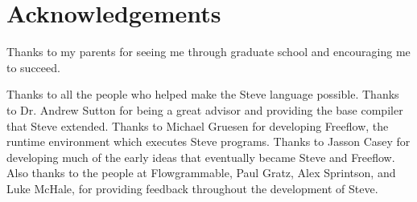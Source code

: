 \chapter*{Acknowledgements}

Thanks to my parents for seeing me through graduate school and encouraging me to succeed.

Thanks to all the people who helped make the Steve language possible.
Thanks to Dr. Andrew Sutton for being a great advisor and providing the base
compiler that Steve extended.
Thanks to Michael Gruesen for developing Freeflow, the runtime environment which executes
Steve programs.
Thanks to Jasson Casey for developing much of the early ideas that eventually became Steve and Freeflow.
Also thanks to the people at Flowgrammable, Paul Gratz, Alex Sprintson, and Luke McHale, for providing
feedback throughout the development of Steve.
